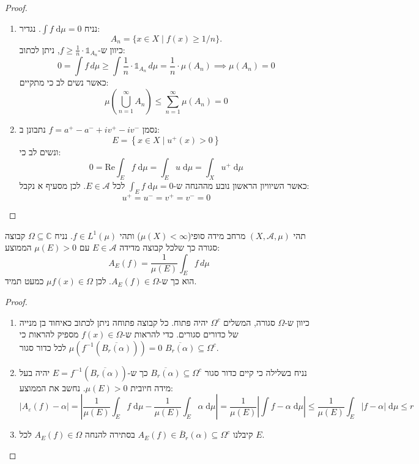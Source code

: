 \documentclass{tstextbook}
\begin{document}
\begin{proof}
  \begin{enumerate}
    \item נניח \(\int f \;\mathrm{d} \mu=0\). נגדיר: 
$$A_{n}=\{x\in X\mid f(x)\geq1/n\}.$$
כיוון ש-\(f\geq \frac{1}{n}\cdot \mathbb{1}_{A_{n}}\), ניתן לכתוב:
$$0=\int f\,d\mu\geq\int\frac{1}{n}\cdot \mathbb{1} _{A_{n}}\,d\mu=\frac{1}{n}\cdot\mu(A_{n})\implies \mu(A_{n})=0$$
כאשר נשים לב כי מתקיים:
$$\mu\left(\bigcup_{n=1}^{\infty}A_{n}\right)\leq\sum_{n=1}^{\infty}\mu(A_{n})=0$$


    \item נסמן \(f=a^{+}-a^{-}+iv^{+}-iv^{-}\) נתבונן ב: 
$$E=\left\{  x \in X \mid u^{+}(x)> 0  \right\}$$
ונשים לב כי:
$$0=\mathrm{Re}\int_{E} f \;\mathrm{d} \mu  = \int _{E}u \;\mathrm{d} \mu = \int _{X}u^{+} \;\mathrm{d} \mu  $$
כאשר השיוויון הראשון נובע מההנחה ש-\(\int _{E}f \;\mathrm{d} \mu=0\) לכל \(E \in \mathcal{A}\). לכן מסעיף א נקבל:
$$u^{+}=u^{-}=v^{+}=v^{-}=0$$


  \end{enumerate}
\end{proof}
\begin{proposition}
תהי \(\left( X,\mathcal{A},\mu \right)\) מרחב מידה סופי(\(\mu(X)<\infty\)) ותהי \(f \in L^{1}\left( \mu \right)\). נניח \(\Omega \subseteq \mathbb{C}\) קבוצה סגורה כך שלכל קבוצה מדידה \(E \in \mathcal{A}\) עם \(\mu(E)> 0\) הממוצע:
$$A_{E}(f)=\frac{1}{\mu(E)}\int_{E}f\,d\mu$$
הוא כך ש-\(A_{E}(f)\in \Omega\). לכן \(f(x) \in \Omega\)\(\mu\) כמעט תמיד.

\end{proposition}
\begin{proof}
  \begin{enumerate}
    \item כיוון ש-\(\Omega\) סגורה, המשלים \(\Omega^{c}\) יהיה פתוח. כל קבוצה פתוחה ניתן לכתוב כאיחוד בן מנייה של כדורים סגורים. 
כדי להראות ש-\(f(x) \in \Omega\) מספיק להראות כי \(\mu\left( f^{-1}\left( \overline{B_{r}\left( \alpha \right)} \right) \right)= 0\) לכל כדור סגור \(\overline{B_{r}\left( \alpha \right)}\subseteq \Omega^{c}\).


    \item נניח בשלילה כי קיים כדור סגור \(\overline{B_{r}\left( \alpha \right)}\subseteq \Omega^{c}\) כך ש-\(E=f^{-1}\left( \overline{B_{r}\left( \alpha \right)}  \right)\) יהיה בעל מידה חיובית \(\mu(E)> 0\). 
נחשב את הממוצע:
$$\left\lvert  A_{\varepsilon}(f)-\alpha  \right\rvert =\left\lvert  \frac{1}{\mu(E)}\int _{E}f \;\mathrm{d} \mu -\frac{1}{\mu(E)}\int _{E}\alpha \;\mathrm{d} \mu \right\rvert=\frac{1}{\mu(E)}   \left\lvert  \int f-\alpha \;\mathrm{d} \mu   \right\rvert \leq \frac{1}{\mu(E)}\int _{E}\left\lvert  f-\alpha  \right\rvert  \;\mathrm{d} \mu \leq r$$


    \item קיבלנו \(A_{E}(f)\in \overline{B}_{r}\left( \alpha \right) \subseteq \Omega^{c}\) בסתירה להנחה \(A_{E}(f)\in \Omega\) לכל \(E\). 


  \end{enumerate}
\end{proof}
\end{document}
